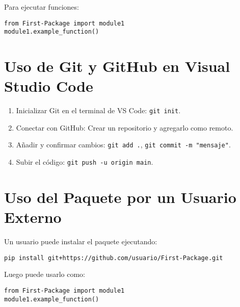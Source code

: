\documentclass{article}
\begin{document}
Para ejecutar funciones:

\begin{verbatim}
from First-Package import module1
module1.example_function()
\end{verbatim}

\section{Uso de Git y GitHub en Visual Studio Code}
\begin{enumerate}
    \item Inicializar Git en el terminal de VS Code: \texttt{git init}.
    \item Conectar con GitHub: Crear un repositorio y agregarlo como remoto.
    \item Añadir y confirmar cambios: \texttt{git add .}, \texttt{git commit -m "mensaje"}.
    \item Subir el código: \texttt{git push -u origin main}.
\end{enumerate}

\section{Uso del Paquete por un Usuario Externo}
Un usuario puede instalar el paquete ejecutando:

\begin{verbatim}
pip install git+https://github.com/usuario/First-Package.git
\end{verbatim}

Luego puede usarlo como:

\begin{verbatim}
from First-Package import module1
module1.example_function()
\end{verbatim}
\end{document}
